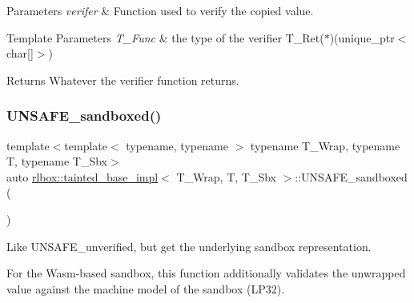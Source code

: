 \begin{DoxyParams}{Parameters}
{\em verifer} & Function used to verify the copied value. \\
\hline
\end{DoxyParams}

\begin{DoxyTemplParams}{Template Parameters}
{\em T\+\_\+\+Func} & the type of the verifier {\ttfamily T\+\_\+\+Ret($\ast$)(unique\+\_\+ptr$<$char\mbox{[}\mbox{]}$>$)} \\
\hline
\end{DoxyTemplParams}
\begin{DoxyReturn}{Returns}
Whatever the verifier function returns. 
\end{DoxyReturn}
\mbox{\label{classrlbox_1_1tainted__base__impl_adb4270e907768562120dc32cf955424e}} 
\subsubsection{\texorpdfstring{U\+N\+S\+A\+F\+E\+\_\+sandboxed()}{UNSAFE\_sandboxed()}}
{\footnotesize\ttfamily template$<$template$<$ typename, typename $>$ typename T\+\_\+\+Wrap, typename T, typename T\+\_\+\+Sbx$>$ \\
auto \hyperlink{classrlbox_1_1tainted__base__impl}{rlbox\+::tainted\+\_\+base\+\_\+impl}$<$ T\+\_\+\+Wrap, T, T\+\_\+\+Sbx $>$\+::U\+N\+S\+A\+F\+E\+\_\+sandboxed (\begin{DoxyParamCaption}{ }\end{DoxyParamCaption})\hspace{0.3cm}{\ttfamily [inline]}}



Like U\+N\+S\+A\+F\+E\+\_\+unverified, but get the underlying sandbox representation. 

For the Wasm-\/based sandbox, this function additionally validates the unwrapped value against the machine model of the sandbox (L\+P32). \mbox{\label{classrlbox_1_1tainted__base__impl_a1292132a467d30150be6d4e2b72ff6b2}} 
